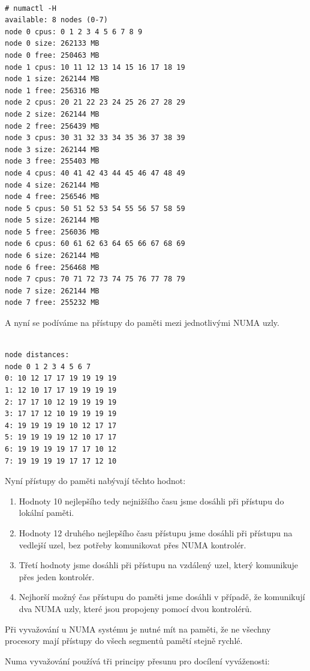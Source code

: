 \documentclass[
  master=true,
  font=sans,
  printversion=false,
  joinlists=true,
  figures=true,
  tables=true,
  sourcecodes=false,
  theorems=false,
  bibencoding=utf8,
  language=czech,
  encoding=utf8,
  field=ainfk,
  biblatex,
  glossaries,
  index
]{kidiplom}
\begin{document}
\begin{verbatim}

# numactl -H
available: 8 nodes (0-7)
node 0 cpus: 0 1 2 3 4 5 6 7 8 9
node 0 size: 262133 MB
node 0 free: 250463 MB
node 1 cpus: 10 11 12 13 14 15 16 17 18 19
node 1 size: 262144 MB
node 1 free: 256316 MB
node 2 cpus: 20 21 22 23 24 25 26 27 28 29
node 2 size: 262144 MB
node 2 free: 256439 MB
node 3 cpus: 30 31 32 33 34 35 36 37 38 39
node 3 size: 262144 MB
node 3 free: 255403 MB
node 4 cpus: 40 41 42 43 44 45 46 47 48 49
node 4 size: 262144 MB
node 4 free: 256546 MB
node 5 cpus: 50 51 52 53 54 55 56 57 58 59
node 5 size: 262144 MB
node 5 free: 256036 MB
node 6 cpus: 60 61 62 63 64 65 66 67 68 69
node 6 size: 262144 MB
node 6 free: 256468 MB
node 7 cpus: 70 71 72 73 74 75 76 77 78 79
node 7 size: 262144 MB
node 7 free: 255232 MB

\end{verbatim}

\newpage
\noindent
A nyní se podíváme na přístupy do paměti mezi jednotlivými NUMA uzly. 
\begin{verbatim}

node distances:
node 0 1 2 3 4 5 6 7
0: 10 12 17 17 19 19 19 19
1: 12 10 17 17 19 19 19 19
2: 17 17 10 12 19 19 19 19
3: 17 17 12 10 19 19 19 19
4: 19 19 19 19 10 12 17 17
5: 19 19 19 19 12 10 17 17
6: 19 19 19 19 17 17 10 12
7: 19 19 19 19 17 17 12 10

\end{verbatim}
\noindent
Nyní přístupy do paměti nabývají těchto hodnot:
\begin{enumerate}
\item Hodnoty 10 nejlepšího tedy nejnižšího času jsme dosáhli při přístupu do lokální paměti.
\item Hodnoty 12 druhého nejlepšího času přístupu jsme dosáhli při přístupu na vedlejší uzel, bez potřeby komunikovat přes NUMA kontrolér. 
\item Třetí hodnoty jsme dosáhli při přístupu na vzdálený uzel, který komunikuje přes jeden kontrolér.
\item Nejhorší možný čas přístupu do paměti jsme dosáhli v případě, že komunikují dva NUMA uzly, které jsou propojeny pomocí dvou kontrolérů.
\end{enumerate}

Při vyvažování u NUMA systému je nutné mít na paměti, že ne všechny procesory mají přístupy do všech segmentů pamětí stejně rychlé.

\noindent
Numa vyvažování používá tři principy přesunu pro docílení vyváženosti:
\end{document}
